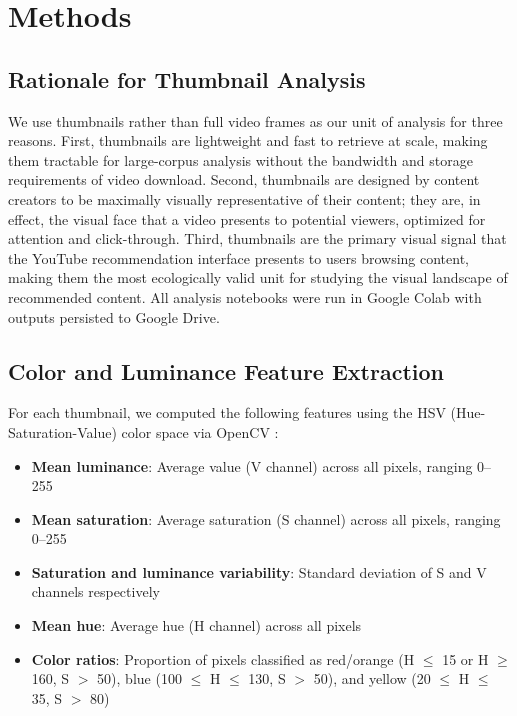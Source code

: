 \documentclass[12pt, letterpaper]{article}
\begin{document}
\section{Methods}

\subsection{Rationale for Thumbnail Analysis}

We use thumbnails rather than full video frames as our unit of analysis for three reasons. First, thumbnails are lightweight and fast to retrieve at scale, making them tractable for large-corpus analysis without the bandwidth and storage requirements of video download. Second, thumbnails are designed by content creators to be maximally visually representative of their content; they are, in effect, the visual face that a video presents to potential viewers, optimized for attention and click-through. Third, thumbnails are the primary visual signal that the YouTube recommendation interface presents to users browsing content, making them the most ecologically valid unit for studying the visual landscape of recommended content. All analysis notebooks were run in Google Colab with outputs persisted to Google Drive.

\subsection{Color and Luminance Feature Extraction}

For each thumbnail, we computed the following features using the HSV (Hue-Saturation-Value) color space via OpenCV \citep{opencv}:

\begin{itemize}
\setlength{\itemsep}{0pt}
\setlength{\parskip}{0pt}
    \item \textbf{Mean luminance}: Average value (V channel) across all pixels, ranging 0--255
    \item \textbf{Mean saturation}: Average saturation (S channel) across all pixels, ranging 0--255
    \item \textbf{Saturation and luminance variability}: Standard deviation of S and V channels respectively
    \item \textbf{Mean hue}: Average hue (H channel) across all pixels
    \item \textbf{Color ratios}: Proportion of pixels classified as red/orange (H $\leq$ 15 or H $\geq$ 160, S $>$ 50), blue (100 $\leq$ H $\leq$ 130, S $>$ 50), and yellow (20 $\leq$ H $\leq$ 35, S $>$ 80)
\end{itemize}
\end{document}
